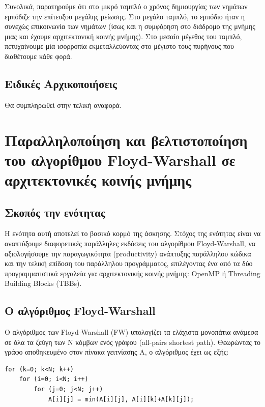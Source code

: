 \documentclass{article}
\begin{document}
Συνολικά, παρατηρούμε ότι στο μικρό ταμπλό ο χρόνος δημιουργίας των νημάτων εμπόδιζε την επίτευξου μεγάλης μείωσης. Στο μεγάλο ταμπλό, το εμπόδιο ήταν η συνεχώς επικοινωνία των νημάτων (ίσως και η συμφόρηση στο διάδρομο της μνήμης μιας και έχουμε αρχιτεκτονική κοινής μνήμης). Στο μεσαίο μέγεθος του ταμπλό, πετυχαίνουμε μία ισορροπία εκμεταλλεύοντας στο μέγιστο τους πυρήνους που διαθέτουμε κάθε φορά.



\subsection{Ειδικές Αρχικοποιήσεις}

Θα συμπληρωθεί στην τελική αναφορά.



\pagebreak 

\section{Παραλληλοποίηση και βελτιστοποίηση του αλγορίθμου Floyd-Warshall σε αρχιτεκτονικές κοινής μνήμης}

\subsection{Σκοπός την ενότητας}
Η ενότητα αυτή αποτελεί το βασικό κορμό της άσκησης. Στόχος της ενότητας είναι να αναπτύξουμε διαφορετικές παράλληλες εκδόσεις του αλγορίθμου Floyd-Warshall, να αξιολογήσουμε την παραγωγικότητα (productivity) ανάπτυξης παράλληλου κώδικα και την τελική επίδοση του παράλληλου προγράμματος, επιλέγοντας ένα από τα δύο προγραμματιστικά εργαλεία για αρχιτεκτονικής κοινής μνήμης: OpenMP ή Threading Building Blocks (TBBs).

\subsection{Ο αλγόριθμος Floyd-Warshall}
Ο αλγόριθμος των Floyd-Warshall (FW) υπολογίζει τα ελάχιστα μονοπάτια ανάμεσα σε όλα τα ζεύγη των N κόμβων ενός γράφου (all-pairs shortest path). Θεωρώντας το γράφο αποθηκευμένο στον πίνακα γειτνίασης A, ο αλγόριθμος έχει ως εξής:

\begin{lstlisting}[style=CStyle]
for (k=0; k<N; k++)
	for (i=0; i<N; i++)
		for (j=0; j<N; j++)
			A[i][j] = min(A[i][j], A[i][k]+A[k][j]);
\end{lstlisting}
\end{document}
